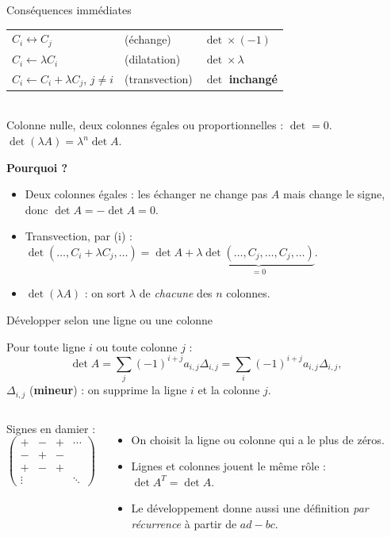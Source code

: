 \documentclass[aspectratio=169,11pt]{beamer}
\begin{document}
\begin{frame}{Conséquences immédiates}
\begin{PROP}
\renewcommand{\arraystretch}{1.25}
\begin{tabular}{@{}lll@{}}
$C_i\leftrightarrow C_j$ & (échange) & $\det\times(-1)$\\
$C_i\leftarrow\lambda C_i$ & (dilatation) & $\det\times\lambda$\\
$C_i\leftarrow C_i+\lambda C_j$, $j\neq i$ & (transvection) & $\det$ \textbf{inchangé}
\end{tabular}\\[3pt]
Colonne nulle, deux colonnes égales ou proportionnelles : $\det=0$.\qquad $\det(\lambda A)=\lambda^n\det A$.
\end{PROP}
\pause
\textbf{Pourquoi ?}
\begin{itemize}
\item Deux colonnes égales : les échanger ne change pas $A$ mais change le signe, donc $\det A=-\det A=0$.
\item Transvection, par (i) : $\det(\dots,C_i+\lambda C_j,\dots)=\det A+\lambda\underbrace{\det(\dots,C_j,\dots,C_j,\dots)}_{=0}$.
\item $\det(\lambda A)$ : on sort $\lambda$ de \emph{chacune} des $n$ colonnes.
\end{itemize}
\end{frame}

\begin{frame}{Développer selon une ligne ou une colonne}
\begin{PROP}
Pour toute ligne $i$ ou toute colonne $j$ :
\[\det A=\sum_j(-1)^{i+j}a_{i,j}\Delta_{i,j}=\sum_i(-1)^{i+j}a_{i,j}\Delta_{i,j},\]
$\Delta_{i,j}$ (\textbf{mineur}) : on supprime la ligne $i$ et la colonne $j$.
\end{PROP}
\begin{columns}[c]
\centering
Signes en damier :\\[3pt]
$\begin{pmatrix}+&-&+&\cdots\\-&+&-&\\+&-&+&\\\vdots&&&\ddots\end{pmatrix}$
\pause
\begin{itemize}
\item On choisit la ligne ou colonne \alert{qui a le plus de zéros}.
\item Lignes et colonnes jouent le même rôle : $\det A^T=\det A$.
\item Le développement donne aussi une définition \emph{par récurrence} à partir de $ad-bc$.
\end{itemize}
\end{columns}
\end{frame}
\end{document}
